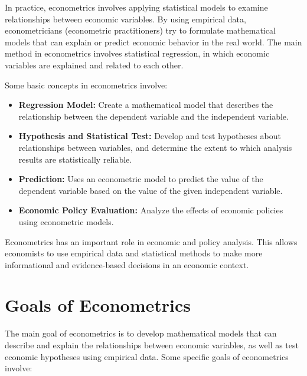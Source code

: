 \documentclass[
]{book}
\providecommand{\tightlist}{%
  \setlength{\itemsep}{0pt}\setlength{\parskip}{0pt}}
\begin{document}
In practice, econometrics involves applying statistical models to examine relationships between economic variables. By using empirical data, econometricians (econometric practitioners) try to formulate mathematical models that can explain or predict economic behavior in the real world. The main method in econometrics involves statistical regression, in which economic variables are explained and related to each other.

Some basic concepts in econometrics involve:

\begin{itemize}
\tightlist
\item
  \textbf{Regression Model:} Create a mathematical model that describes the relationship between the dependent variable and the independent variable.
\item
  \textbf{Hypothesis and Statistical Test:} Develop and test hypotheses about relationships between variables, and determine the extent to which analysis results are statistically reliable.
\item
  \textbf{Prediction:} Uses an econometric model to predict the value of the dependent variable based on the value of the given independent variable.
\item
  \textbf{Economic Policy Evaluation:} Analyze the effects of economic policies using econometric models.
\end{itemize}

Econometrics has an important role in economic and policy analysis. This allows economists to use empirical data and statistical methods to make more informational and evidence-based decisions in an economic context.

\hypertarget{goals-of-econometrics}{%
\section{Goals of Econometrics}\label{goals-of-econometrics}}

The main goal of econometrics is to develop mathematical models that can describe and explain the relationships between economic variables, as well as test economic hypotheses using empirical data. Some specific goals of econometrics involve:
\end{document}
